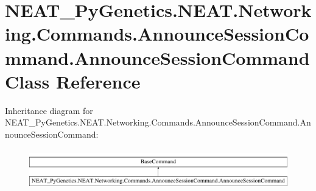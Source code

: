 \hypertarget{classNEAT__PyGenetics_1_1NEAT_1_1Networking_1_1Commands_1_1AnnounceSessionCommand_1_1AnnounceSessionCommand}{}\section{N\+E\+A\+T\+\_\+\+Py\+Genetics.\+N\+E\+A\+T.\+Networking.\+Commands.\+Announce\+Session\+Command.\+Announce\+Session\+Command Class Reference}
\label{classNEAT__PyGenetics_1_1NEAT_1_1Networking_1_1Commands_1_1AnnounceSessionCommand_1_1AnnounceSessionCommand}
Inheritance diagram for N\+E\+A\+T\+\_\+\+Py\+Genetics.\+N\+E\+A\+T.\+Networking.\+Commands.\+Announce\+Session\+Command.\+Announce\+Session\+Command\+:\begin{figure}[H]
\begin{center}
\leavevmode
\includegraphics[height=1.821138cm]{classNEAT__PyGenetics_1_1NEAT_1_1Networking_1_1Commands_1_1AnnounceSessionCommand_1_1AnnounceSessionCommand}
\end{center}
\end{figure}
